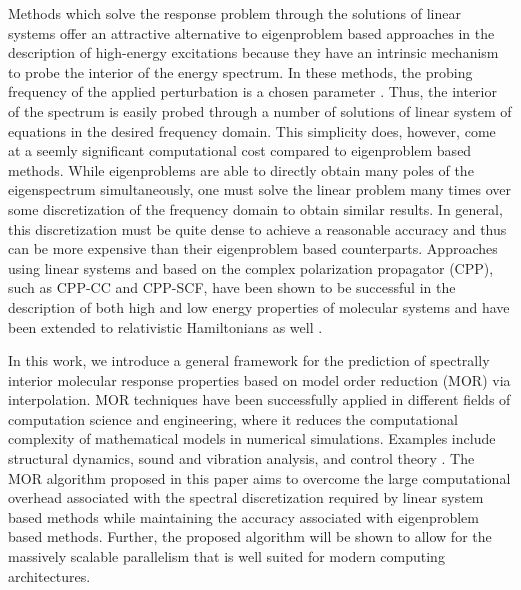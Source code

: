 Methods which solve the response problem through the solutions of linear systems offer an attractive alternative to eigenproblem based approaches in the description of high-energy excitations because they have an intrinsic
mechanism to probe the interior of the energy spectrum. In these methods, the
probing frequency of the applied perturbation is a chosen parameter \cite{Hattig98_1,Ruud12_543}. Thus,
the interior of the spectrum is easily probed through a number of solutions
of linear system of equations in the desired frequency domain. This simplicity 
does, however, come at a seemly significant computational cost compared to eigenproblem based methods.
While eigenproblems are able to directly obtain many poles of the eigenspectrum
simultaneously, one must solve the linear problem many times
over some discretization of the frequency domain to obtain similar results.
In general, this discretization must be quite dense to achieve a reasonable 
accuracy and thus can be more expensive than their eigenproblem based counterparts. Approaches using linear systems and based on the complex
polarization propagator (CPP), such as CPP-CC \cite{Norman12_1616,Norman13_124311,Coriani13_211102} and CPP-SCF, \cite{Rubio_Book,Ruud12_543,Yeager84_33,Oddershede01_JCP}
have been shown to be successful in the description of both high \cite{Norman16_1991,Norman12_022507,Norman10_5096,Agren06_143001,Norman16_13591} and low \cite{Mathieu15_21866} energy properties of molecular systems and have been extended to relativistic Hamiltonians as well \cite{Norman10_064105}.

In this work, we introduce a general framework for the prediction of spectrally interior molecular response properties based on model order reduction (MOR) via interpolation. MOR techniques have been successfully applied in different fields of computation science and engineering, where it reduces the computational complexity of mathematical models in numerical simulations. Examples include structural dynamics, sound and vibration analysis, and control theory \cite{Antoulas2005,Farhat12_IJNME,Farhat13_IJNME}. The MOR algorithm proposed in this paper aims to overcome the large computational overhead associated with the spectral discretization required by linear system based methods while maintaining the accuracy associated with eigenproblem based methods. Further, the proposed algorithm will be shown to allow for the massively scalable parallelism that is well suited for modern computing architectures.


